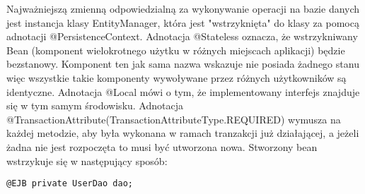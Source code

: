 Najważniejszą zmienną odpowiedzialną za wykonywanie operacji na bazie danych jest instancja klasy EntityManager, która jest "wstrzyknięta" do klasy za pomocą adnotacji @PersistenceContext. Adnotacja @Stateless oznacza, że wstrzykniwany Bean (komponent wielokrotnego użytku w różnych miejscach aplikacji) będzie bezstanowy. Komponent ten jak sama nazwa wskazuje nie posiada żadnego stanu więc wszystkie takie komponenty wywoływane przez różnych użytkowników są identyczne. Adnotacja @Local mówi o tym, że implementowany interfejs znajduje się w tym samym środowisku. Adnotacja @TransactionAttribute(TransactionAttributeType.REQUIRED) wymusza na każdej metodzie, aby była wykonana w ramach tranzakcji już działającej, a jeżeli żadna nie jest rozpoczęta to musi być utworzona nowa. Stworzony bean wstrzykuje się w następujący sposób:
\begin{lstlisting}
@EJB private UserDao dao;
\end{lstlisting}

